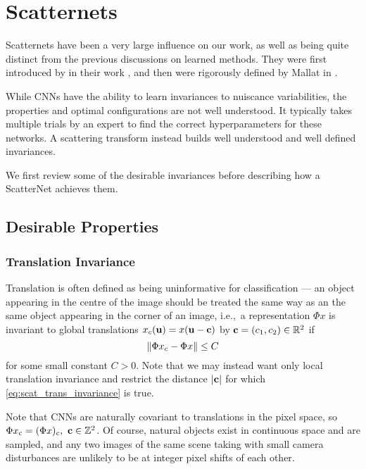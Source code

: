 \section{Scatternets}\label{ch:scatternets}
  Scatternets have been a very large influence on
  our work, as well as being quite distinct from the previous discussions on
  learned methods. They were first introduced by  
  \citeauthor{bruna_classification_2011} in their work 
  \cite{bruna_classification_2011}, and then were rigorously defined by Mallat
  in \cite{mallat_group_2012}.   

  While CNNs have the ability to learn invariances to nuiscance variabilities, 
  the properties and optimal configurations are not well understood. 
  It typically takes multiple trials
  by an expert to find the correct hyperparameters for these networks. A
  scattering transform instead builds well understood and well defined invariances. 
  
  We first review some of the desirable invariances before describing how a
  ScatterNet achieves them.

\subsection{Desirable Properties}
\subsubsection{Translation Invariance}
  Translation is often defined as being uninformative for classification --- an
  object appearing in the centre of the image should be treated the same way as
  an the same object appearing in the corner of an image, i.e.,\ a
  representation $\Phi x$ is invariant to global translations $x_c(\mathbf{u}) =
  x(\mathbf{u}-\mathbf{c})$ by 
  $\mathbf{c}=(c_1,c_2) \in \mathbb{R}^2$ if
  \begin{equation}\label{eq:scat_trans_invariance}
    \left\lVert \Phi x_c - \Phi x \right\rVert \leq C
  \end{equation}
  for some small constant $C>0$.
  Note that we may instead want only local translation invariance and
  restrict the distance $|\mathbf{c}|$ for which \eqref{eq:scat_trans_invariance}
  is true. 
  
  Note that CNNs are naturally covariant to translations in the pixel space, 
  so $\Phi x_c = (\Phi x)_c,\ \mathbf{c} \in \mathbb{Z}^2$. Of course, natural objects
  exist in continuous space and are sampled, and any two images of the same
  scene taking with small camera disturbances are unlikely to be at integer pixel 
  shifts of each other.

